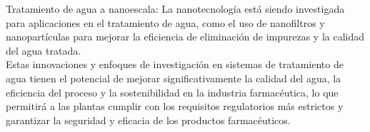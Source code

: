 Tratamiento de agua a nanoescala: La nanotecnología está siendo investigada para aplicaciones en el tratamiento de agua, como el uso de nanofiltros y nanopartículas para mejorar la eficiencia de eliminación de impurezas y la calidad del agua tratada.\\

Estas innovaciones y enfoques de investigación en sistemas de tratamiento de agua tienen el potencial de mejorar significativamente la calidad del agua, la eficiencia del proceso y la sostenibilidad en la industria farmacéutica, lo que permitirá a las plantas cumplir con los requisitos regulatorios más estrictos y garantizar la seguridad y eficacia de los productos farmacéuticos.\\
